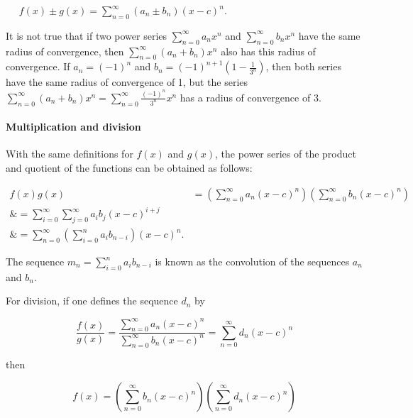 $\quad$ $f(x) \pm g(x) = \sum _{n=0}^\infty (a _n \pm b _n) (x - c)^n.$



It is not true that if two power series $\sum _{n=0}^\infty a _n x^n$ and $\sum _{n=0}^\infty b _n x^n$ have the same radius of convergence, then $\sum _{n=0}^\infty \left(a _n + b _n\right) x^n$ also has this radius of convergence. If $a _n = (-1)^n$ and $b _n = (-1)^{n+1} \left(1 - \frac{1}{3^n}\right)$, then both series have the same radius of convergence of 1, but the series $\sum _{n=0}^\infty \left(a _n + b _n\right) x^n = \sum _{n=0}^\infty \frac{(-1)^n}{3^n} x^n$ has a radius of convergence of 3.



\paragraph{Multiplication and division}



With the same definitions for $f(x)$ and $g(x)$, the power series of the product and quotient of the functions can be obtained as follows:



\begin{align}
f(x)g(x) &= \left(\sum _{n=0}^\infty a _n (x-c)^n\right)\left(\sum _{n=0}^\infty b _n (x - c)^n\right) \\\&= \sum _{i=0}^\infty \sum _{j=0}^\infty  a _i b _j (x - c)^{i+j} \\\&= \sum _{n=0}^\infty \left(\sum _{i=0}^n a _i b _{n-i}\right) (x - c)^n.
\end{align}





The sequence $m _n = \sum _{i=0}^n a _i b _{n-i}$ is known as the convolution of the sequences $a _n$ and $b _n$.



For division, if one defines the sequence $d _n$ by



$$\frac{f(x)}{g(x)} = \frac{\sum _{n=0}^\infty a _n (x - c)^n}{\sum _{n=0}^\infty b _n (x - c)^n} = \sum _{n=0}^\infty d _n (x - c)^n$$



then



$$f(x) = \left(\sum _{n=0}^\infty b _n (x - c)^n\right)\left(\sum _{n=0}^\infty d _n (x - c)^n\right)$$



